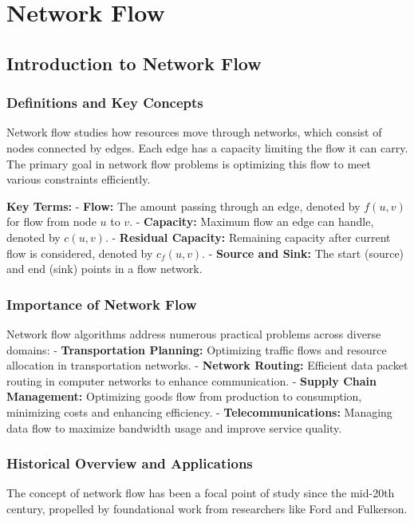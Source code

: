 \documentclass[12pt]{book} %
\begin{document}
\chapter{Network Flow}

\section{Introduction to Network Flow}

\subsection{Definitions and Key Concepts}

Network flow studies how resources move through networks, which consist of nodes connected by edges. Each edge has a capacity limiting the flow it can carry. The primary goal in network flow problems is optimizing this flow to meet various constraints efficiently.

\textbf{Key Terms:}
- \textbf{Flow:} The amount passing through an edge, denoted by \( f(u, v) \) for flow from node \( u \) to \( v \).
- \textbf{Capacity:} Maximum flow an edge can handle, denoted by \( c(u, v) \).
- \textbf{Residual Capacity:} Remaining capacity after current flow is considered, denoted by \( c_f(u, v) \).
- \textbf{Source and Sink:} The start (source) and end (sink) points in a flow network.

\subsection{Importance of Network Flow}

Network flow algorithms address numerous practical problems across diverse domains:
- \textbf{Transportation Planning:} Optimizing traffic flows and resource allocation in transportation networks.
- \textbf{Network Routing:} Efficient data packet routing in computer networks to enhance communication.
- \textbf{Supply Chain Management:} Optimizing goods flow from production to consumption, minimizing costs and enhancing efficiency.
- \textbf{Telecommunications:} Managing data flow to maximize bandwidth usage and improve service quality.

\subsection{Historical Overview and Applications}

The concept of network flow has been a focal point of study since the mid-20th century, propelled by foundational work from researchers like Ford and Fulkerson.
\end{document}
